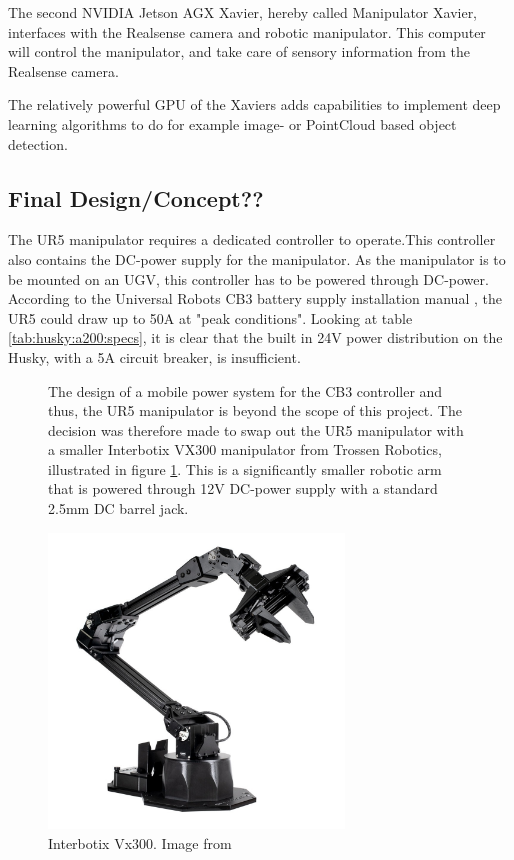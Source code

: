 The second NVIDIA Jetson AGX Xavier, hereby called Manipulator Xavier, interfaces with the Realsense camera and robotic manipulator. This computer will control the manipulator, and take care of sensory information from the Realsense camera. 

The relatively powerful GPU of the Xaviers adds capabilities to implement deep learning algorithms to do for example image- or PointCloud based object detection.

\subsection{Final Design/Concept??}

The UR5 manipulator requires a dedicated controller to operate.This controller also contains the DC-power supply for the manipulator. As the manipulator is to be mounted on an UGV, this controller has to be powered through DC-power. According to the Universal Robots CB3 battery supply installation manual \cite{ur5_battery_manual}, the UR5 could draw up to 50A at "peak conditions". Looking at table \ref{tab:husky:a200:specs}, it is clear that the built in 24V power distribution on the Husky, with a 5A circuit breaker, is insufficient.

\begin{figure}[H]
  \centering
  \begin{minipage}[b]{0.49\textwidth}
        \centering
        The design of a mobile power system for the CB3 controller and thus, the UR5 manipulator is beyond the scope of this project. The decision was therefore made to swap out the UR5 manipulator with a smaller Interbotix VX300 manipulator from Trossen Robotics, illustrated in figure \ref{fig:vx300}. This is a significantly smaller robotic arm that is powered through 12V DC-power supply with a standard 2.5mm DC barrel jack. 
  \end{minipage}
  \hfill
  \begin{minipage}[b]{0.49\textwidth}
   \centering
  \includegraphics[width = 0.7\textwidth]{Figures/VX300.jpg}
  \caption{Interbotix Vx300. Image from \cite{interbotix_vx300}}
  \label{fig:vx300}
  \end{minipage}
\end{figure}
  
